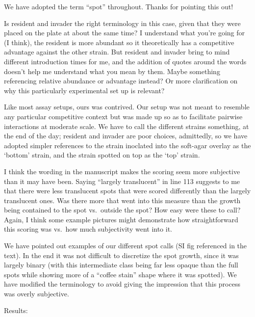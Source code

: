 \documentclass[11pt,]{article}
\begin{document}
We have adopted the term ``spot'' throughout. Thanks for pointing this
out!

\begin{blockquote}
Is resident and invader the right terminology in this case, given that
they were placed on the plate at about the same time? I understand what
you're going for (I think), the resident is more abundant so it
theoretically has a competitive advantage against the other strain. But
resident and invader bring to mind different introduction times for me,
and the addition of quotes around the words doesn't help me understand
what you mean by them. Maybe something referencing relative abundance or
advantage instead? Or more clarification on why this particularly
experimental set up is relevant?
\end{blockquote}

Like most assay setups, ours was contrived. Our setup was not meant to
resemble any particular competitive context but was made up so as to
facilitate pairwise interactions at moderate scale. We have to call the
different strains something, at the end of the day; resident and invader
are poor choices, admittedly, so we have adopted simpler references to
the strain inoclated into the soft-agar overlay as the `bottom' strain,
and the strain spotted on top as the `top' strain.

\begin{blockquote}
I think the wording in the manuscript makes the scoring seem more
subjective than it may have been. Saying ``largely translucent'' in line
113 suggests to me that there were less translucent spots that were
scored differently than the largely translucent ones. Was there more
that went into this measure than the growth being contained to the spot
vs.~outside the spot? How easy were these to call? Again, I think some
example pictures might demonstrate how straightforward this scoring was
vs.~how much subjectivity went into it.
\end{blockquote}

We have pointed out examples of our different spot calls (SI fig
referenced in the text). In the end it was not difficult to discretize
the spot growth, since it was largely binary (with this intermediate
class being far less opaque than the full spots while showing more of a
``coffee stain'' shape where it was spotted). We have modified the
terminology to avoid giving the impression that this process was overly
subjective.

\begin{blockquote}
Results:
\end{blockquote}
\end{document}
